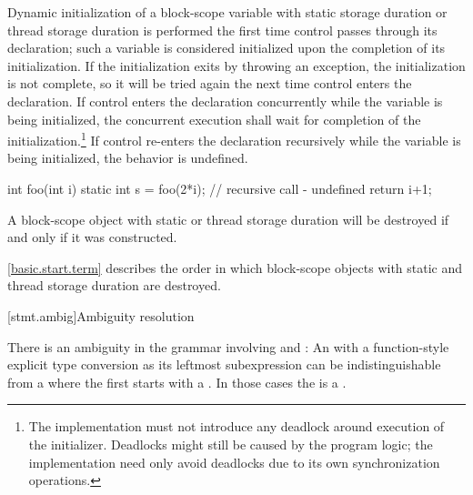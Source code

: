 \pnum
{}%
%
%
%
Dynamic initialization of a block-scope variable with
static storage duration or
thread storage duration is performed
the first time control passes through its declaration; such a variable is
considered initialized upon the completion of its initialization. If the
initialization exits by throwing an exception, the initialization is not
complete, so it will be tried again the next time control enters the
declaration.
If control enters the declaration concurrently while the variable is
being initialized, the concurrent execution shall wait for completion
of the initialization.\footnote{The implementation must not introduce
any deadlock around execution of the initializer. Deadlocks might
still be caused by the program logic; the implementation need only
avoid deadlocks due to its own synchronization operations.} If control
re-enters the declaration recursively while
the variable is being initialized, the behavior is undefined.
\begin{example}
\begin{codeblock}
int foo(int i) {
  static int s = foo(2*i);      // recursive call - undefined
  return i+1;
}
\end{codeblock}
\end{example}

\pnum
{}%
A block-scope object with static or thread storage duration will be
destroyed if and only if it was constructed.
\begin{note}
\ref{basic.start.term} describes the order in which block-scope objects with
static and thread storage duration are destroyed.
\end{note}

[stmt.ambig]{Ambiguity resolution}%

\pnum
There is an ambiguity in the grammar involving
 and : An
 with a function-style explicit type
conversion as its leftmost subexpression can be
indistinguishable from a  where the first
 starts with a \tcode{(}. In those cases the
 is a .

